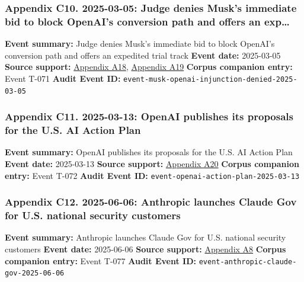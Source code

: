 \documentclass[
  american,
  11pt,
  letterpaper,
]{article}
\begin{document}
\subsubsection{Appendix C10. 2025-03-05: Judge denies Musk's immediate
bid to block OpenAI's conversion path and offers an
exp\ldots{}}\label{appendix-c10-2025-03-05-judge-denies-musk-s-immediate-bid-to-block-openai-s-conversion-path-and-offers-an-expedited-trial-track}

\textbf{Event summary:} Judge denies Musk's immediate bid to block
OpenAI's conversion path and offers an expedited trial track
\textbf{Event date:} 2025-03-05 \textbf{Source support:}
\hyperref[appendix-a18-judge-denies-elon-musk-s-request-to-block-openai-for-profit-conversion-but-welcomes-trial]{Appendix
A18},
\hyperref[appendix-a19-judge-denies-elon-musks-attempt-to-immediately-block-openais-conversion-to-for-profit-entity]{Appendix
A19} \textbf{Corpus companion entry:} Event T-071 \textbf{Audit Event
ID:} \texttt{event-musk-openai-injunction-denied-2025-03-05}

\subsubsection{Appendix C11. 2025-03-13: OpenAI publishes its proposals
for the U.S. AI Action
Plan}\label{appendix-c11-2025-03-13-openai-publishes-its-proposals-for-the-u-s-ai-action-plan}

\textbf{Event summary:} OpenAI publishes its proposals for the U.S. AI
Action Plan \textbf{Event date:} 2025-03-13 \textbf{Source support:}
\hyperref[appendix-a20-openais-proposals-for-the-us-ai-action-plan]{Appendix
A20} \textbf{Corpus companion entry:} Event T-072 \textbf{Audit Event
ID:} \texttt{event-openai-action-plan-2025-03-13}

\subsubsection{Appendix C12. 2025-06-06: Anthropic launches Claude Gov
for U.S. national security
customers}\label{appendix-c12-2025-06-06-anthropic-launches-claude-gov-for-u-s-national-security-customers}

\textbf{Event summary:} Anthropic launches Claude Gov for U.S. national
security customers \textbf{Event date:} 2025-06-06 \textbf{Source
support:}
\hyperref[appendix-a8-claude-gov-models-for-u-s-national-security-customers]{Appendix
A8} \textbf{Corpus companion entry:} Event T-077 \textbf{Audit Event
ID:} \texttt{event-anthropic-claude-gov-2025-06-06}
\end{document}
